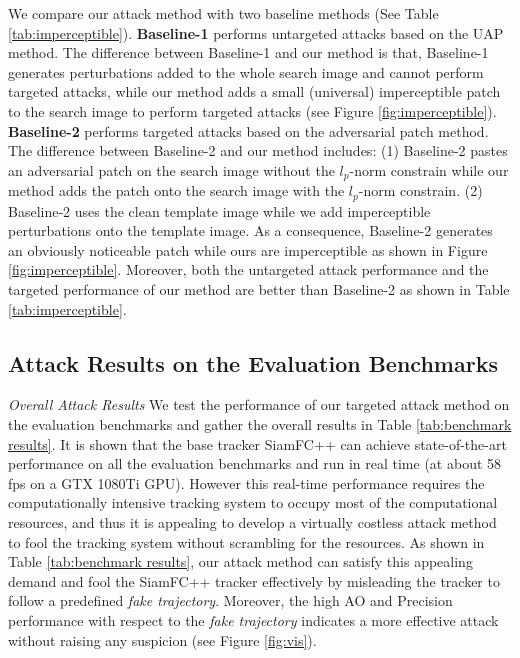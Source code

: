 \documentclass[journal]{IEEEtran}
\begin{document}
We compare our attack method with two baseline methods (See Table \ref{tab:imperceptible}).
\textbf{Baseline-1} performs untargeted attacks based on the UAP \cite{UAP} method. The difference between Baseline-1 and our method is that, Baseline-1 generates perturbations added to the whole search image and cannot perform targeted attacks, while our method adds a small (universal) imperceptible patch to the search image to perform targeted attacks (see Figure \ref{fig:imperceptible}).
\textbf{Baseline-2} performs targeted attacks based on the adversarial patch \cite{patch} method. The difference between Baseline-2 and our method includes: (1) Baseline-2 pastes an adversarial patch on the search image without the $l_p\text{-norm}$ constrain while our method adds the patch onto the search image with the $l_p\text{-norm}$ constrain. (2) Baseline-2 uses the clean template image while we add imperceptible perturbations onto the template image. As a consequence, Baseline-2 generates an obviously noticeable patch while ours are imperceptible as shown in Figure \ref{fig:imperceptible}. Moreover, both the untargeted attack performance and the targeted performance of our method are better than Baseline-2 as shown in Table \ref{tab:imperceptible}.

\subsection{Attack Results on the Evaluation Benchmarks}

\textit{Overall Attack Results} We test the performance of our targeted attack method on the evaluation benchmarks and gather the overall results in Table \ref{tab:benchmark results}. It is shown that the base tracker SiamFC++ can achieve state-of-the-art performance on all the evaluation benchmarks and run in real time (at about 58 fps on a GTX 1080Ti GPU). However this real-time performance requires the computationally intensive tracking system to occupy most of the computational resources, and thus it is appealing to develop a virtually costless attack method to fool the tracking system without scrambling for the resources. As shown in Table \ref{tab:benchmark results}, our attack method can satisfy this appealing demand and fool the SiamFC++ tracker effectively by misleading the tracker to follow a predefined \textit{fake trajectory}. Moreover, the high AO and Precision performance with respect to the \textit{fake trajectory} indicates a more effective attack without raising any suspicion (see Figure \ref{fig:vis}).
\end{document}
